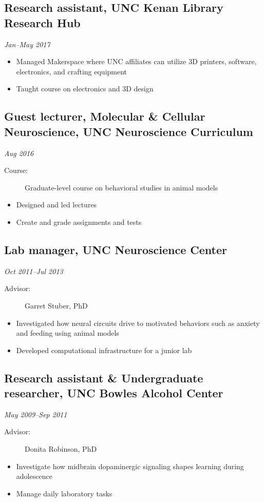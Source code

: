 \documentclass{article}
\newcommand{\dateformat}[1]{\textit{#1}}
\begin{document}
  \subsection*{Research assistant, UNC Kenan Library Research Hub}
    \dateformat{Jan--May 2017}
    \begin{itemize}
      \item Managed Makerspace where UNC affiliates can utilize 3D printers, software, electronics, and crafting equipment
      \item Taught course on electronics and 3D design
    \end{itemize}

  \subsection*{Guest lecturer, Molecular \& Cellular Neuroscience, UNC Neuroscience Curriculum}
  \dateformat{Aug 2016}
    \begin{description}
      \item[Course:] Graduate-level course on behavioral studies in animal models
    \end{description}
    \begin{itemize}
      \item Designed and led lectures
      \item Create and grade assignments and tests
    \end{itemize}
    
  \subsection*{Lab manager, UNC Neuroscience Center}
  \dateformat{Oct 2011--Jul 2013}
    \begin{description}
      \item[Advisor:] Garret Stuber, PhD
    \end{description}
    \begin{itemize}
      \item Investigated how neural circuits drive to motivated behaviors such as anxiety and feeding using animal models
      \item Developed computational infrastructure for a junior lab
    \end{itemize}

  \subsection*{Research assistant \& Undergraduate researcher, UNC Bowles Alcohol Center}
    \dateformat{May 2009--Sep 2011}
    \begin{description}
      \item[Advisor:] Donita Robinson, PhD
    \end{description}
    \begin{itemize}
      \item Investigate how midbrain dopaminergic signaling shapes learning during adolescence
      \item Manage daily laboratory tasks
    \end{itemize}
\end{document}
